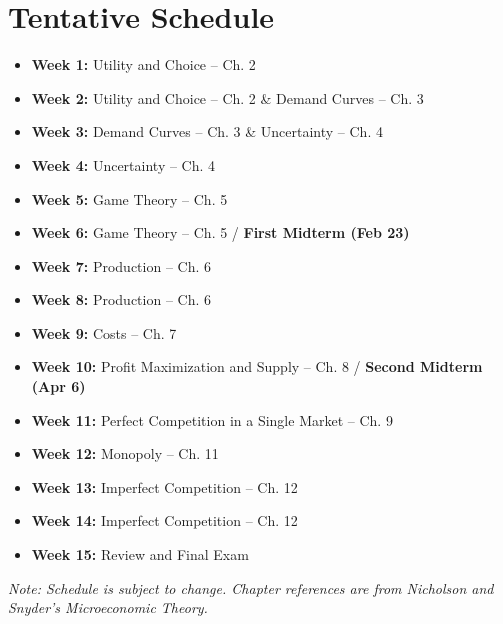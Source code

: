 \documentclass[11pt,letterpaper]{article}
\begin{document}
\section*{Tentative Schedule}

\begin{itemize}
    \item \textbf{Week 1:} Utility and Choice – Ch. 2
    \item \textbf{Week 2:} Utility and Choice – Ch. 2 \& Demand Curves – Ch. 3
    \item \textbf{Week 3:} Demand Curves – Ch. 3 \& Uncertainty – Ch. 4
    \item \textbf{Week 4:} Uncertainty – Ch. 4
    \item \textbf{Week 5:} Game Theory – Ch. 5
    \item \textbf{Week 6:} Game Theory – Ch. 5 / \textbf{First Midterm (Feb 23)}
    \item \textbf{Week 7:} Production – Ch. 6
    \item \textbf{Week 8:} Production – Ch. 6
    \item \textbf{Week 9:} Costs – Ch. 7
    \item \textbf{Week 10:} Profit Maximization and Supply – Ch. 8 / \textbf{Second Midterm (Apr 6)}
    \item \textbf{Week 11:} Perfect Competition in a Single Market – Ch. 9
    \item \textbf{Week 12:} Monopoly – Ch. 11
    \item \textbf{Week 13:} Imperfect Competition – Ch. 12
    \item \textbf{Week 14:} Imperfect Competition – Ch. 12
    \item \textbf{Week 15:} Review and Final Exam
\end{itemize}

\textit{Note: Schedule is subject to change. Chapter references are from Nicholson and Snyder's Microeconomic Theory.}
\end{document}
